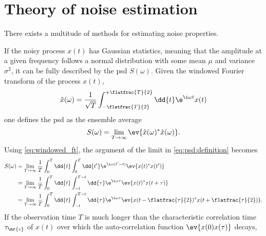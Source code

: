 \chapter{Theory of noise estimation}\label{ch:speck:theory}
There exists a multitude of methods for estimating noise properties.

If the noisy process $x(t)$
has Gaussian statistics, meaning that the amplitude at a given frequency follows a normal distribution with some mean $\mu$ and variance $\sigma^2$, it can be fully described by the \gls{psd} $S(\omega)$.
Given the windowed Fourier transform of the process $x(t)$,
\begin{align}\label{eq:windowed_ft}
    \hat{x}(\omega) = \frac{1}{\sqrt{T}}\int_{-\flatfrac{T}{2}}^{+\flatfrac{T}{2}}\dd{t}\e^{\i\omega t}x(t)
\end{align}
one defines the \gls{psd} as the ensemble average~\cite{Clerk2010}
\begin{align}\label{eq:psd:definition}
    S(\omega) = \lim_{T\rightarrow\infty}\ev{\hat{x}(\omega)^\ast\hat{x}(\omega)}.
\end{align}
Using \cref{eq:windowed_ft}, the argument of the limit in \cref{eq:psd:definition} becomes
\begin{align}\label{eq:wiener_khinchin_theorem}
    S(\omega) &= \lim_{T\rightarrow\infty}\frac{1}{T}\int_0^T\dd{t}\int_0^T\dd{t'}\e^{\i\omega(t'-t)}\ev{x(t)^\ast x(t')} \\
              &= \lim_{T\rightarrow\infty}\frac{1}{T}\int_0^T\dd{t}\int_{-t}^{T - t}\dd{\tau}\e^{\i\omega\tau}\ev{x(t)^\ast x(t + \tau)} \\
              &= \lim_{T\rightarrow\infty}\frac{1}{T}\int_0^T\dd{t}\int_{-t}^{T - t}\dd{\tau}\e^{\i\omega\tau}\ev{x(t - \flatfrac{\tau}{2})^\ast x(t + \flatfrac{\tau}{2})}.
\end{align}
If the observation time $T$ is much longer than the characteristic correlation time $\tau_\mr{c}$ of $x(t)$ over which the auto-correlation function $\ev{x(0)x(\tau)}$ decays,

